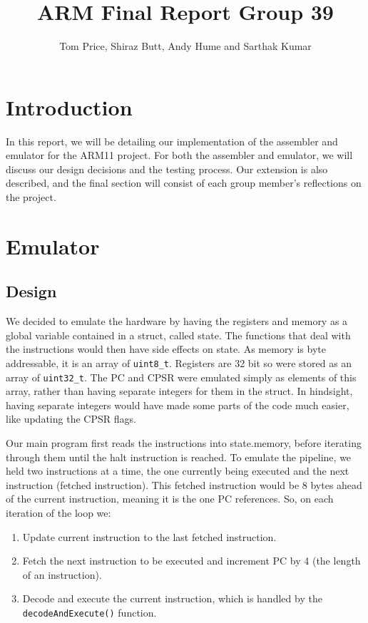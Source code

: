\documentclass[a4paper]{article}
\title{ARM Final Report Group 39}
\author{Tom Price, Shiraz Butt, Andy Hume and Sarthak Kumar}
\begin{document}
\maketitle

\section{Introduction}

In this report, we will be detailing our implementation of the assembler and emulator for the ARM11 project. For both the assembler and emulator, we will discuss our design decisions and the testing process. Our extension is also described, and the final section will consist of each group member's reflections on the project.

\section{Emulator}

\subsection{Design}

We decided to emulate the hardware by having the registers and memory as a global variable contained in a struct, called state. The functions that deal with the instructions would then have side effects on state. As memory is byte addressable, it is an array of \texttt{uint8\_t}. Registers are 32 bit so were stored as an array of \texttt{uint32\_t}. The PC and CPSR were emulated simply as elements of this array, rather than having separate integers for them in the struct. In hindsight, having separate integers would have made some parts of the code much easier, like updating the CPSR flags. 

Our main program first reads the instructions into state.memory, before iterating through them until the halt instruction is reached. To emulate the pipeline, we held two instructions at a time, the one currently being executed and the next instruction (fetched instruction). This fetched instruction would be 8 bytes ahead of the current instruction, meaning it is the one PC references. So, on each iteration of the loop we:

\begin{enumerate}
\item Update current instruction to the last fetched instruction.
\item Fetch the next instruction to be executed and increment PC by 4 (the length of an instruction).
\item Decode and execute the current instruction, which is handled by the \texttt{decodeAndExecute()} function.
\end{enumerate}
\end{document}
